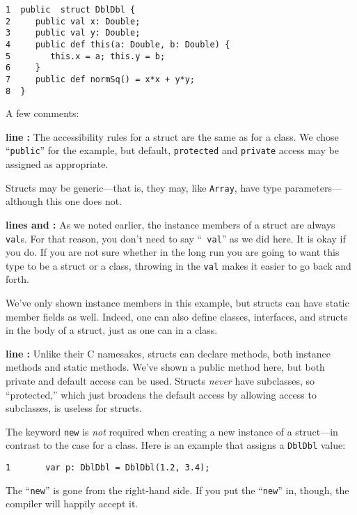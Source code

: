 \begin{verbatim}
1  public  struct DblDbl {
2     public val x: Double;
3     public val y: Double;
4     public def this(a: Double, b: Double) { 
5        this.x = a; this.y = b;
6     }
7     public def normSq() = x*x + y*y;
8  }
\end{verbatim}



A few comments:
\begin{description}
\item{\bf line :} The accessibility rules for a struct are the same as for a
class.  We chose ``{\tt public}'' for the example, but default, {\tt protected} 
and {\tt private} access may be assigned as appropriate.

Structs may be generic---that is, they may, like {\tt Array}, have type
parameters---although this one does not.

\item{\bf lines  and :}  As we noted earlier, the instance members of a struct
are always {\tt val}s. For that reason, you don't need to say ``{\tt
val}'' as we did here.  It is okay if you do. If you are not sure whether in
the long run you are going to want this type to be a struct or a class,
throwing in the {\tt val} makes it easier to go back and forth.

We've only shown instance members in this example, but
structs can have static member fields as well.
Indeed, one can also define classes, interfaces, and structs in the
body of a struct, just as one can in a class.
\item 
 
\item{\bf line :} Unlike their C namesakes, \Xten{} structs can declare
methods, both instance methods and static methods. We've shown a public
method here, but both private and default access can be used. Structs
{\em never} have subclasses, so ``protected,'' which just broadens the default
access by allowing access to subclasses, is useless for structs.
\end{description}

The keyword {\tt new} is {\em not} required when creating
 a new instance of a struct---in contrast to the case for a class.
Here is an example that assigns a {\tt DblDbl} value:
\begin{verbatim}
1       var p: DblDbl = DblDbl(1.2, 3.4);
\end{verbatim}
The ``{\tt new}'' is gone from the right-hand side.
If you put the ``{\tt new}'' in, though, the compiler will happily accept it.

